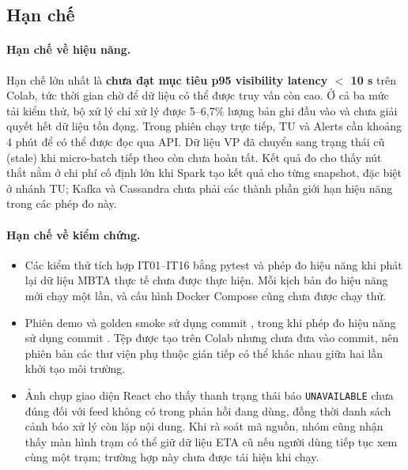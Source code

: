 \subsection{Hạn chế}

\paragraph{Hạn chế về hiệu năng.} Hạn chế lớn nhất là \textbf{chưa đạt mục tiêu p95 visibility latency $<$ 10 s} trên Colab, tức thời gian chờ để dữ liệu có thể được truy vấn còn cao. Ở cả ba mức tải kiểm thử, bộ xử lý chỉ xử lý được 5--6,7\% lượng bản ghi đầu vào và chưa giải quyết hết dữ liệu tồn đọng. Trong phiên chạy trực tiếp, TU và Alerts cần khoảng 4 phút để có thể được đọc qua API. Dữ liệu VP đã chuyển sang trạng thái cũ (stale) khi micro-batch tiếp theo còn chưa hoàn tất. Kết quả đo cho thấy nút thắt nằm ở chi phí cố định lớn khi Spark tạo kết quả cho từng snapshot, đặc biệt ở nhánh TU; Kafka và Cassandra chưa phải các thành phần giới hạn hiệu năng trong các phép đo này.

\paragraph{Hạn chế về kiểm chứng.}
\begin{itemize}
    \item Các kiểm thử tích hợp IT01--IT16 bằng pytest và phép đo hiệu năng khi phát lại dữ liệu MBTA thực tế chưa được thực hiện. Mỗi kịch bản đo hiệu năng mới chạy một lần, và cấu hình Docker Compose cũng chưa được chạy thử.
    \item Phiên demo và golden smoke sử dụng commit , trong khi phép đo hiệu năng sử dụng commit . Tệp  được tạo trên Colab nhưng chưa đưa vào commit, nên phiên bản các thư viện phụ thuộc gián tiếp có thể khác nhau giữa hai lần khởi tạo môi trường.
    \item Ảnh chụp giao diện React cho thấy thanh trạng thái báo \texttt{UNAVAILABLE} chưa đúng đối với feed không có trong phản hồi đang dùng, đồng thời danh sách cảnh báo xử lý còn lặp nội dung. Khi rà soát mã nguồn, nhóm cũng nhận thấy màn hình trạm có thể giữ dữ liệu ETA cũ nếu người dùng tiếp tục xem cùng một trạm; trường hợp này chưa được tái hiện khi chạy.
\end{itemize}

